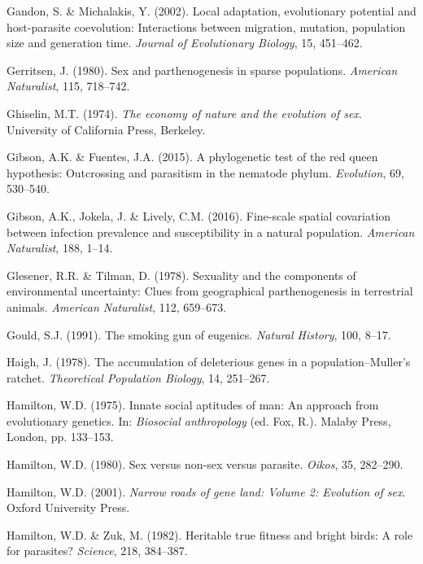 \documentclass[
  letterpaper,
]{book}
\newlength{\cslhangindent}
\newenvironment{CSLReferences}[2] %
 {\begin{list}{}{%
  \setlength{\itemindent}{0pt}
  \setlength{\leftmargin}{0pt}
  \setlength{\parsep}{0pt}
  \ifodd #1
   \setlength{\leftmargin}{\cslhangindent}
   \setlength{\itemindent}{-1\cslhangindent}
  \fi
  \setlength{\itemsep}{#2\baselineskip}}}
 {\end{list}}
\begin{document}
\begin{CSLReferences}{1}{0}
Gandon, S. \& Michalakis, Y. (2002). Local adaptation, evolutionary
potential and host-parasite coevolution: Interactions between migration,
mutation, population size and generation time. \emph{Journal of
Evolutionary Biology}, 15, 451--462.

Gerritsen, J. (1980). Sex and parthenogenesis in sparse populations.
\emph{American Naturalist}, 115, 718--742.

Ghiselin, M.T. (1974). \emph{The economy of nature and the evolution of
sex}. University of California Press, Berkeley.

Gibson, A.K. \& Fuentes, J.A. (2015). A phylogenetic test of the red
queen hypothesis: Outcrossing and parasitism in the nematode phylum.
\emph{Evolution}, 69, 530--540.

Gibson, A.K., Jokela, J. \& Lively, C.M. (2016). Fine-scale spatial
covariation between infection prevalence and susceptibility in a natural
population. \emph{American Naturalist}, 188, 1--14.

Glesener, R.R. \& Tilman, D. (1978). Sexuality and the components of
environmental uncertainty: Clues from geographical parthenogenesis in
terrestrial animals. \emph{American Naturalist}, 112, 659--673.

Gould, S.J. (1991). The smoking gun of eugenics. \emph{Natural History},
100, 8--17.

Haigh, J. (1978). The accumulation of deleterious genes in a
population--{Muller's} ratchet. \emph{Theoretical Population Biology},
14, 251--267.

Hamilton, W.D. (1975). Innate social aptitudes of man: An approach from
evolutionary genetics. In: \emph{Biosocial anthropology} (ed. Fox, R.).
Malaby Press, London, pp. 133--153.

Hamilton, W.D. (1980). Sex versus non-sex versus parasite. \emph{Oikos},
35, 282--290.

Hamilton, W.D. (2001). \emph{Narrow roads of gene land: Volume 2:
Evolution of sex}. Oxford University Press.

Hamilton, W.D. \& Zuk, M. (1982). Heritable true fitness and bright
birds: A role for parasites? \emph{Science}, 218, 384--387.


\end{CSLReferences}
\end{document}
